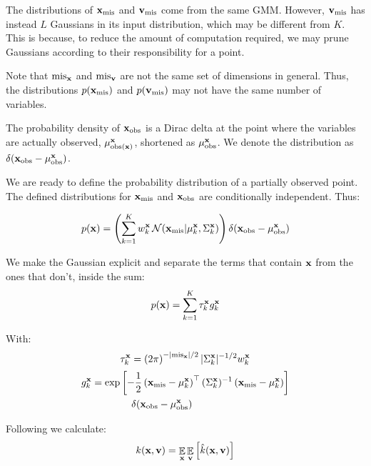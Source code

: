 \documentclass[letterpaper]{article}
\DeclareMathOperator*{\E}{\Ex}
\newcommand{\Ex}{\mathbb{E}}
\newcommand{\tp}{\top}
\newcommand{\vx}{{\bf x}}
\newcommand{\vv}{{\bf v}}
\newcommand{\mis}{\text{mis}}
\newcommand{\misx}{{\text{mis}_\vx}}
\begin{document}
The distributions of $\vx_\mis$ and $\vv_\mis$ come from the same \ac{GMM}.
However, $\vv_\mis$ has instead $L$ Gaussians in its input distribution, which may be
different from $K$. This is because, to reduce the amount of computation
required, we may prune Gaussians according to their responsibility for a point.

Note that
$\text{mis}_\vx$ and $\text{mis}_\vv$ are not the same set of dimensions in
general. Thus, the distributions $p(\vx_\text{mis})$ and $p(\vv_\text{mis})$ may
not have the same number of variables.

The probability density of $\vx_\text{obs}$ is a Dirac delta at the point where
the variables are actually observed, $\mu^\vx_{\text{obs}(\vx)}$, shortened as
$\mu^\vx_\text{obs}$. We denote the distribution as
$\delta(\vx_\text{obs}-\mu^\vx_\text{obs})$.

We are ready to define the probability distribution of a partially observed
point. The defined distributions for $\vx_\text{mis}$ and $\vx_\text{obs}$ are
conditionally independent. Thus:

\begin{equation}
p(\vx) = \left(\sum_{k=1}^K w_k^\vx \, \mathcal{N}(\vx_\text{mis}| \mu^\vx_k,
  \Sigma^\vx_k)\right) \delta(\vx_\text{obs}-\mu^\vx_\text{obs})
\label{eq:pdf-partially-observed-long}
\end{equation}

We make the Gaussian explicit and separate the terms that contain $\vx$ from the
ones that don't, inside the sum:
\begin{equation}
p(\vx) = \sum_{k=1}^K \tau_k^\vx g_k^\vx
\label{eq:pdf-partially-observed}
\end{equation}

With:
\begin{equation*}
\tau_k^\vx = \left(2\pi\right)^{-|\misx|/2} |\Sigma_k^\vx|^{-1/2}w_k^\vx
\end{equation*}
\begin{equation*}
  \begin{aligned}
g_k^\vx &= \exp\left[-\frac{1}{2}\left(\vx_\text{mis} -
    \mu_k^\vx\right)^\tp(\Sigma_k^\vx)^{-1}\left(\vx_\text{mis} - \mu_k^\vx\right)\right] \\
&\hspace{4em} \delta(\vx_\text{obs}-\mu^\vx_\text{obs})
  \end{aligned}
\end{equation*}

Following  we calculate:
\begin{equation}
  k(\vx, \vv) = \E_\vx \E_\vv \left[ \hat{k}(\vx, \vv) \right]
  \label{eq:expect-kernel}
\end{equation}
\end{document}
